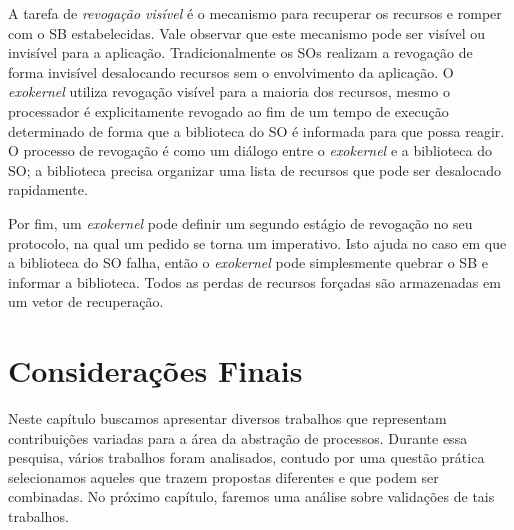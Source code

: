 A tarefa de \emph{revogação visível} é o mecanismo para recuperar os recursos
e romper com o SB estabelecidas. Vale observar que este mecanismo pode ser
visível ou invisível para a aplicação. Tradicionalmente os SOs realizam a
revogação de forma invisível desalocando recursos sem o envolvimento da
aplicação. O \emph{exokernel} utiliza revogação visível para a maioria dos
recursos, mesmo o processador é explicitamente revogado ao fim de um tempo de
execução determinado de forma que a biblioteca do SO é informada para que possa
reagir. O processo de revogação é como um diálogo entre o \emph{exokernel} e a
biblioteca do SO; a biblioteca precisa organizar uma lista de recursos que pode
ser desalocado rapidamente.

Por fim, um \emph{exokernel} pode definir um segundo estágio de revogação no
seu protocolo, na qual um pedido se torna um imperativo. Isto ajuda no caso em
que a biblioteca do SO falha, então o \emph{exokernel} pode simplesmente
quebrar o SB e informar a biblioteca. Todos as perdas de recursos forçadas são
armazenadas em um vetor de recuperação.

% 

\section{Considerações Finais}

Neste capítulo buscamos apresentar diversos trabalhos que representam
contribuições variadas para a área da abstração de processos. Durante essa
pesquisa, vários trabalhos foram analisados, contudo por uma questão prática
selecionamos aqueles que trazem propostas diferentes e que podem ser
combinadas. No próximo capítulo, faremos uma análise sobre validações de tais
trabalhos.
